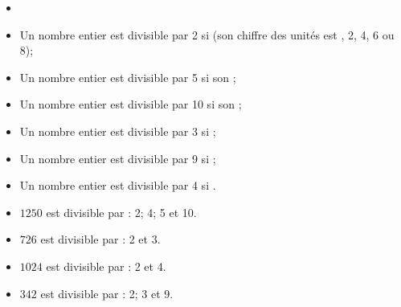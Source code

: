 \begin{myprops}
	
	\begin{itemize}
		\item \item Un nombre entier est divisible par 2 si  (son chiffre des unités est , 2, 4, 6 ou 8);
		\item Un nombre entier est divisible par 5 si son ;
		\item Un nombre entier est divisible par 10 si son ;	
	
		\item Un nombre entier est divisible par 3 si ;
		\item Un nombre entier est divisible par 9 si ;
		
		\item Un nombre entier est divisible par 4 si .
	\end{itemize}
\end{myprops}

\begin{myexs}
	\begin{itemize}
		\item $1250$ est divisible par : 2; 4; 5 et 10. 
		\item $726$ est divisible par : 2 et 3.
		\item $1024$ est divisible par : 2 et 4.
		\item $342$ est divisible par : 2; 3 et 9.
		
	\end{itemize}
\end{myexs}


